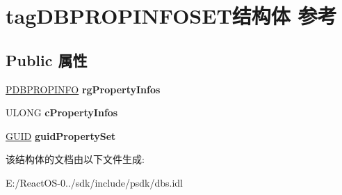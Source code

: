 \hypertarget{structtag_d_b_p_r_o_p_i_n_f_o_s_e_t}{}\section{tag\+D\+B\+P\+R\+O\+P\+I\+N\+F\+O\+S\+E\+T结构体 参考}
\label{structtag_d_b_p_r_o_p_i_n_f_o_s_e_t}
\subsection*{Public 属性}
\begin{DoxyCompactItemize}
\item 
\mbox{\label{structtag_d_b_p_r_o_p_i_n_f_o_s_e_t_af31f0bb11670eabbf8807e4b11696be7}} 
\hyperlink{structtag_d_b_p_r_o_p_i_n_f_o}{P\+D\+B\+P\+R\+O\+P\+I\+N\+FO} {\bfseries rg\+Property\+Infos}
\item 
\mbox{\label{structtag_d_b_p_r_o_p_i_n_f_o_s_e_t_ae8ab31b6d689dcce0eab24ec8f36d7a1}} 
U\+L\+O\+NG {\bfseries c\+Property\+Infos}
\item 
\mbox{\label{structtag_d_b_p_r_o_p_i_n_f_o_s_e_t_a2d21284653c82196d18edfaab52c27a7}} 
\hyperlink{interface_g_u_i_d}{G\+U\+ID} {\bfseries guid\+Property\+Set}
\end{DoxyCompactItemize}


该结构体的文档由以下文件生成\+:\begin{DoxyCompactItemize}
\item 
E\+:/\+React\+O\+S-\/0../sdk/include/psdk/dbs.\+idl\end{DoxyCompactItemize}
